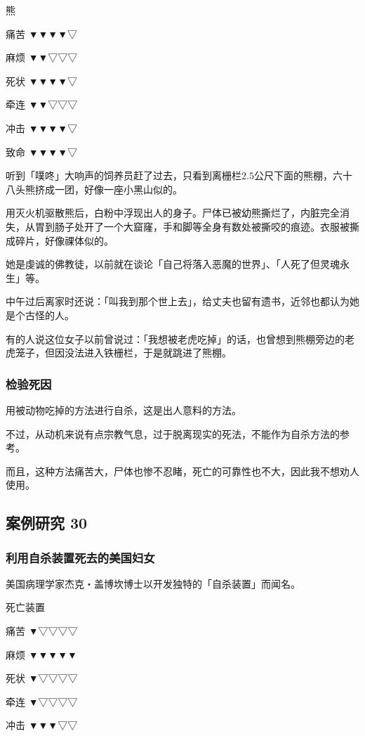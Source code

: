 \documentclass[UTF8]{ctexart}
\begin{document}
熊

痛苦 ▼▼▼▼▽ 

麻烦 ▼▼▽▽▽ 

死状 ▼▼▼▼▽

牵连 ▼▼▽▽▽

冲击 ▼▼▼▼▽

致命 ▼▼▼▼▽

听到「噗咚」大响声的饲养员赶了过去，只看到离栅栏$2.5$公尺下面的熊棚，六十八头熊挤成一团，好像一座小黑山似的。

用灭火机驱散熊后，白粉中浮现出人的身子。尸体已被幼熊撕烂了，内脏完全消失，从胃到肠子处开了一个大窟窿，手和脚等全身有数处被撕咬的痕迹。衣服被撕成碎片，好像祼体似的。

她是虔诚的佛教徒，以前就在谈论「自己将落入恶魔的世界」、「人死了但灵魂永生」等。

中午过后离家时还说：「叫我到那个世上去」，给丈夫也留有遗书，近邻也都认为她是个古怪的人。
 
有的人说这位女子以前曾说过：「我想被老虎吃掉」的话，也曾想到熊棚旁边的老虎笼子，但因没法进入铁栅栏，于是就跳进了熊棚。

\subsubsection*{检验死因}

用被动物吃掉的方法进行自杀，这是出人意料的方法。

不过，从动机来说有点宗教气息，过于脱离现实的死法，不能作为自杀方法的参考。

而且，这种方法痛苦大，尸体也惨不忍睹，死亡的可靠性也不大，因此我不想劝人使用。



\subsection{案例研究 30}

\subsubsection*{利用自杀装置死去的美国妇女}

美国病理学家杰克‧盖博坎博士以开发独特的「自杀装置」而闻名。

死亡装置

痛苦 ▼▽▽▽▽

麻烦 ▼▼▼▼▼

死状 ▼▽▽▽▽

牵连 ▼▽▽▽▽

冲击 ▼▼▼▽▽
\end{document}
